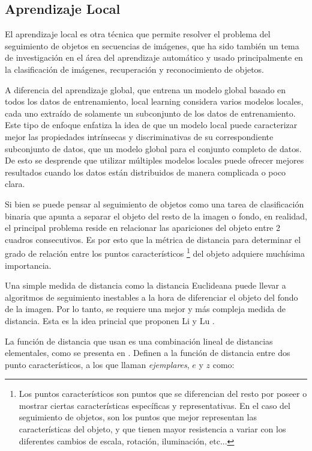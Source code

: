 \documentclass[a4paper,10pt]{article}
\begin{document}
\subsection{Aprendizaje Local}

El aprendizaje local es otra técnica que permite resolver el problema del seguimiento de objetos en secuencias de imágenes,
que ha sido también un tema de investigación en el área del aprendizaje automático \cite{local-learning-machine-learning} y usado principalmente en la clasificación 
de imágenes, recuperación y reconocimiento de objetos.

A diferencia del aprendizaje global, que entrena un modelo global basado en 
todos los datos de entrenamiento, local learning considera varios modelos locales, cada uno extraído de solamente un subconjunto de los datos de entrenamiento.
Este tipo de enfoque enfatiza la idea de que un modelo local puede caracterizar mejor las propiedades intrínsecas y discriminativas de su correspondiente 
subconjunto de datos, que un modelo global para el conjunto completo de datos. De esto se desprende que utilizar múltiples modelos locales puede ofrecer 
mejores resultados cuando los datos están distribuidos de manera complicada o poco clara.

Si bien se puede pensar al seguimiento de objetos como una tarea de clasificación binaria 
que apunta a separar el objeto del resto de la imagen o fondo, en realidad, el principal
problema reside en relacionar las apariciones del objeto entre 2 cuadros
consecutivos. Es por esto que la métrica de distancia para determinar el grado de 
relación entre los puntos característicos \footnote{Los puntos característicos son puntos que se diferencian del resto por poseer o mostrar
ciertas características específicas y representativas. En el caso del seguimiento de objetos, son los puntos que mejor representan las características
del objeto, y que tienen mayor resistencia a variar con los diferentes cambios de escala, rotación, iluminación, etc...}
del objeto adquiere muchísima importancia.

Una simple medida de distancia como la distancia Euclideana puede llevar a algoritmos
de seguimiento inestables a la hora de diferenciar el objeto del fondo de la imagen. Por
lo tanto, se requiere una mejor y más compleja medida de distancia. Esta 
es la idea princial que proponen Li y Lu \cite{local-learning}.

La función de distancia que usan es una combinación lineal de distancias elementales, 
como se presenta en \cite{malisiewicz-cvpr08}. Definen a la función de distancia entre dos 
punto característicos, a los que llaman \textit{ejemplares}, $e$ y $z$ como:
\end{document}
